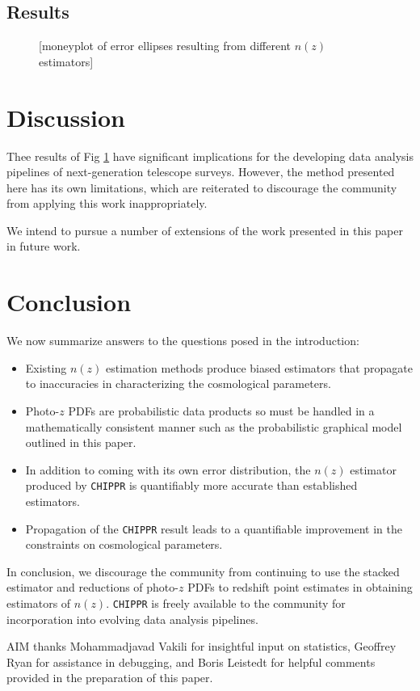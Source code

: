 \documentclass[iop]{emulateapj}
\newcommand{\chippr}{\texttt{CHIPPR} }
\begin{document}
\subsection{Results}
\label{sec:results}

\begin{figure}
	\begin{center}
		\caption{[moneyplot of error ellipses resulting from different 
$n(z)$ estimators]}
		\label{fig:money}
	\end{center}
\end{figure}

\section{Discussion}
\label{sec:discussion}

Thee results of Fig \ref{fig:money} have significant implications for the 
developing data analysis pipelines of next-generation telescope surveys.  
However, the method presented here has its own limitations, which are 
reiterated to discourage the community from applying this work inappropriately.

We intend to pursue a number of extensions of the work presented in this paper 
in future work.

\section{Conclusion}
\label{sec:conclusion}

We now summarize answers to the questions posed in the introduction:

\begin{itemize}
	\item Existing $n(z)$ estimation methods produce biased estimators that 
propagate to inaccuracies in characterizing the cosmological parameters.
	\item Photo-$z$ PDFs are probabilistic data products so must be handled 
in a mathematically consistent manner such as the probabilistic graphical model 
outlined in this paper.
	\item In addition to coming with its own error distribution, the $n(z)$ 
estimator produced by \chippr is quantifiably more accurate than established 
estimators.
	\item Propagation of the \chippr result leads to a quantifiable 
improvement in the constraints on cosmological parameters.
\end{itemize}

In conclusion, we discourage the community from continuing to use the stacked 
estimator and reductions of photo-$z$ PDFs to redshift point estimates in 
obtaining estimators of $n(z)$.  \chippr is freely available to the community 
for incorporation into evolving data analysis pipelines.  



\begin{acknowledgements}
AIM thanks Mohammadjavad Vakili for insightful input on statistics, Geoffrey 
Ryan for assistance in debugging, and Boris Leistedt for helpful comments 
provided in the preparation of this paper.
\end{acknowledgements}
\end{document}
